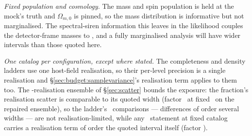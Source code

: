 \emph{Fixed population and cosmology.} The mass and spin population is held at
the mock's truth and $\Omega_{m,0}$ is pinned, so the mass distribution is
informative but not marginalised. The spectral-siren information this leaves in
the likelihood couples the detector-frame masses to \Hz, and a fully
marginalised analysis will have wider intervals than those quoted here.

\emph{One catalog per configuration, except where stated.} The completeness and
density ladders use one host-field realisation, so their per-level precision is
a single realisation and \S\ref{sec:budget:samplevariance}'s realisation term
applies to them too. The \SdsN-realisation ensemble of \S\ref{sec:scatter}
bounds the exposure: the fraction's realisation scatter is comparable to its
quoted width (factor \SdsFixFscanFactor\ at fixed \Hz\ on the repaired
ensemble), so the ladder's \fagn\ comparisons --- differences of order
several widths --- are not realisation-limited, while any \Hz\ statement at
fixed catalog carries a realisation term of order the quoted interval itself
(factor \SdsFixHzeroFactor).
